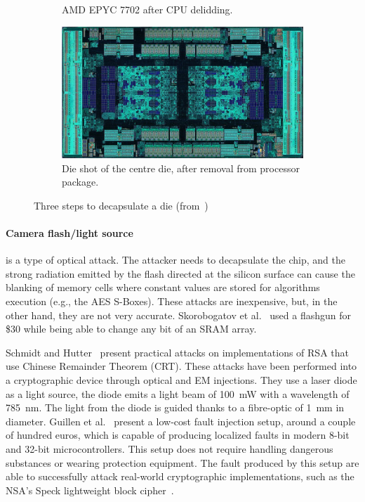 \begin{figure}[ht]
\begin{subfigure}[b]{0.3\textwidth}
        \caption{AMD EPYC 7702 after CPU delidding.}
        \label{fig:delidding_die}
    \end{subfigure}
    \hfill
    \begin{subfigure}[b]{0.3\textwidth}
        \includegraphics[width=\textwidth]{c2_soa/img/epyc_7702_packagedRemoved.jpg}
        \caption{Die shot of the centre die, after removal from processor package.}
        \label{fig:packagedRemoved_die}
    \end{subfigure}
    \caption{Three steps to decapsulate a die (from~\cite{decapping-19-wikipedia})}
    \label{fig:decapsulating_die}
\end{figure}


\paragraph{Camera flash/light source} is a type of optical attack. The attacker needs to decapsulate the chip, and the strong radiation emitted by the flash directed at the silicon surface can cause the blanking of memory cells where constant values are stored for algorithms execution (e.g., the AES S-Boxes). These attacks are inexpensive, but, in the other hand, they are not very accurate. Skorobogatov et al.~\cite{SA-02-ches} used a flashgun for \$30 while being able to change any bit of an SRAM array.

Schmidt and Hutter~\cite{SH-07-austrochip} present practical attacks on implementations of RSA that use Chinese Remainder Theorem (CRT). These attacks have been performed into a cryptographic device through optical and EM injections. They use a laser diode  as a light source, the diode emits a light  beam of \SI{100}{\milli\watt} with a wavelength of \SI{785}{\nano\metre}. The light from the diode is guided thanks to a fibre-optic of 1~mm in diameter.
Guillen et al.~\cite{GGD-17-cosade} present a low-cost fault injection setup, around a couple of hundred euros, which is capable of producing localized faults in modern 8-bit and 32-bit microcontrollers. This setup does not require handling dangerous substances or wearing protection equipment. The fault produced by this setup are able to successfully attack real-world cryptographic implementations, such as the NSA’s Speck lightweight block cipher~\cite{RDJSBL-13-nsa}.

